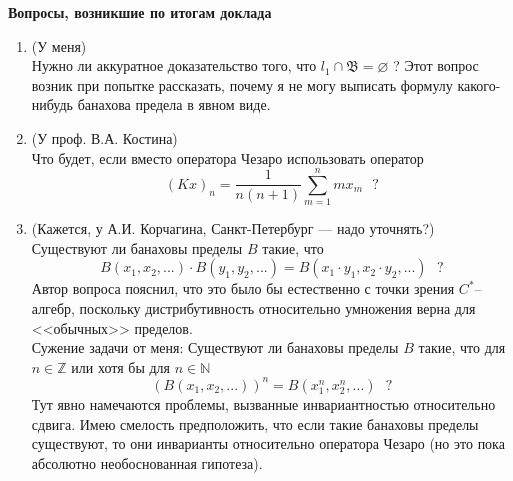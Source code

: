 \documentclass[a4paper,14pt]{article} %
\begin{document}

{\center\bf
	Вопросы, возникшие по итогам доклада
}

\begin{enumerate}
	\item
		(У меня)
		\\
		Нужно ли аккуратное доказательство того, что $l_1 \cap \mathfrak{B} = \varnothing$ ?
		Этот вопрос возник при попытке рассказать,
		почему я не могу выписать формулу какого-нибудь банахова предела в явном виде.
	\item
		(У проф. В.А. Костина)
		\\
		Что будет, если вместо оператора Чезаро использовать оператор
		\begin{equation}
			(Kx)_n = \frac{1}{n(n+1)}\sum_{m=1}^n mx_m ~~~ \mbox{?}
		\end{equation}
	\item
		(Кажется, у А.И. Корчагина, Санкт-Петербург --- надо уточнять?)
		\\
		Существуют ли банаховы пределы $B$ такие, что
		\begin{equation}
			B(x_1,x_2,...) \cdot B(y_1,y_2,...) = B(x_1\cdot y_1, x_2\cdot y_2, ...)  ~~~ \mbox{?}
		\end{equation}
		Автор вопроса пояснил, что это было бы естественно с точки зрения $C^*$--алгебр,
		поскольку дистрибутивность относительно умножения верна для <<обычных>> пределов.
		\\
		Сужение задачи от меня:
		Существуют ли банаховы пределы $B$ такие, что для $n\in\mathbb{Z}$ или хотя бы для $n\in\mathbb{N}$
		\begin{equation}
			(B(x_1,x_2,...))^n = B(x_1^n, x_2^n, ...)  ~~~ \mbox{?}
		\end{equation}
		Тут явно намечаются проблемы, вызванные инвариантностью относительно сдвига.
		Имею смелость предположить, что если такие банаховы пределы существуют,
		то они инварианты относительно оператора Чезаро
		(но это пока абсолютно необоснованная гипотеза).
\end{enumerate}
\end{document}
